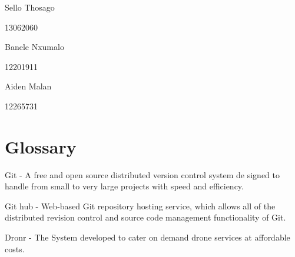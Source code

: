 \documentclass{article}
\begin{document}
\begin{titlepage}
\begin{center}
			\begin{minipage}{0.4\textwidth}
				\begin{flushleft} \large
					Sello {Thosago}
				\end{flushleft}
			\end{minipage}
			\begin{minipage}{0.4\textwidth}
				\begin{flushright} \large
					\emph{}
					13062060
				\end{flushright}
			\end{minipage}
			
			\begin{minipage}{0.4\textwidth}
				\begin{flushleft} \large
					Banele {Nxumalo}
				\end{flushleft}
			\end{minipage}
			\begin{minipage}{0.4\textwidth}
				\begin{flushright} \large
					\emph{}
					12201911
				\end{flushright}
			\end{minipage}
			
			\begin{minipage}{0.4\textwidth}
				\begin{flushleft} \large
					Aiden {Malan}
				\end{flushleft}
			\end{minipage}
			\begin{minipage}{0.4\textwidth}
				\begin{flushright} \large
					\emph{}
					12265731
				\end{flushright}
			\end{minipage}
			
			
			\vfill
			
		\end{center}
	\end{titlepage}
	\footnotesize
	\normalsize
	
	
	\tableofcontents
	\newpage
	
		\section{Glossary}
		
		\begin{itemsize}  
			
		\item Git - A free and open source distributed version control system de
		signed to handle from small to very large projects with speed
		and efficiency.
		
		\item Git hub - Web-based Git repository hosting service, which allows all of
		the distributed revision control and source code management 
		functionality of Git.
		
		\item Dronr - The System developed to cater on demand drone services at affordable costs.
		
		\end{itemsize}  
		
\end{document}
